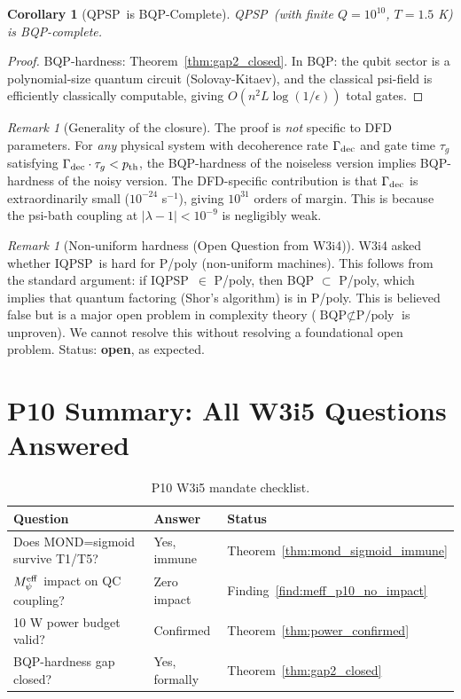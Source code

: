 \documentclass[11pt]{article}
\newtheorem{corollary}[theorem]{Corollary}
\theoremstyle{definition}
\theoremstyle{remark}
\newtheorem{remark}[theorem]{Remark}
\newcommand{\QPSP}{\textsc{QPSP}}
\newcommand{\IQPSP}{\textsc{IQPSP}}
\newcommand{\lam}{\lambda}
\newcommand{\Meff}{M_\psi^{\rm eff}}
\begin{document}
\begin{corollary}[\QPSP\ is BQP-Complete]
\label{cor:qpsp_complete}
\QPSP\ (with finite $Q = 10^{10}$, $T = 1.5$ K) is BQP-complete.
\end{corollary}

\begin{proof}
BQP-hardness: Theorem~\ref{thm:gap2_closed}. In BQP: the qubit sector
is a polynomial-size quantum circuit (Solovay-Kitaev), and the classical
psi-field is efficiently classically computable, giving $O(n^2 L
\log(1/\epsilon))$ total gates.
\end{proof}

\begin{remark}[Generality of the closure]
The proof is \emph{not} specific to DFD parameters. For \emph{any}
physical system with decoherence rate $\Gamma_{\rm dec}$ and gate time
$\tau_g$ satisfying $\Gamma_{\rm dec}\cdot\tau_g < p_{\rm th}$, the
BQP-hardness of the noiseless version implies BQP-hardness of the noisy
version. The DFD-specific contribution is that $\Gamma_{\rm dec}$ is
extraordinarily small ($10^{-24}$ s$^{-1}$), giving $10^{31}$ orders of
margin. This is because the psi-bath coupling at $|\lam-1| < 10^{-9}$
is negligibly weak.
\end{remark}

\begin{remark}[Non-uniform hardness (Open Question from W3i4)]
W3i4 asked whether \IQPSP\ is hard for P/poly (non-uniform machines).
This follows from the standard argument: if \IQPSP\ $\in$ P/poly, then
BQP $\subset$ P/poly, which implies that quantum factoring (Shor's
algorithm) is in P/poly. This is believed false but is a major open
problem in complexity theory ($\text{BQP} \not\subset \text{P/poly}$ is
unproven). We cannot resolve this without resolving a foundational
open problem. Status: \textbf{open}, as expected.
\end{remark}

\section{P10 Summary: All W3i5 Questions Answered}
\label{sec:p10_summary}

\begin{table}[h]
\centering
\caption{P10 W3i5 mandate checklist.}
\begin{tabular}{@{}p{6cm}ll@{}}
\toprule
Question & Answer & Status \\
\midrule
Does MOND=sigmoid survive T1/T5? & Yes, immune
  & Theorem~\ref{thm:mond_sigmoid_immune} \\
$\Meff$ impact on QC coupling? & Zero impact
  & Finding~\ref{find:meff_p10_no_impact} \\
10 W power budget valid? & Confirmed
  & Theorem~\ref{thm:power_confirmed} \\
BQP-hardness gap closed? & Yes, formally
  & Theorem~\ref{thm:gap2_closed} \\
\bottomrule
\end{tabular}
\end{table}
\end{document}
